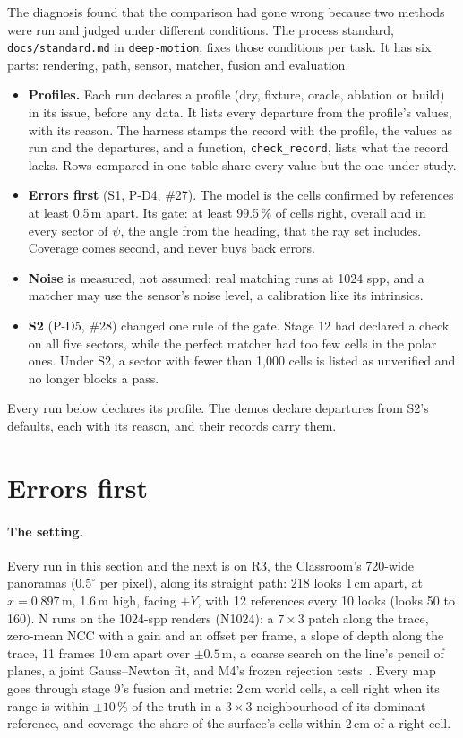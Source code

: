 \documentclass[11pt,a4paper]{article}
\newcommand{\code}[1]{\texttt{\small #1}}
\newcommand{\pth}[1]{{\small\nolinkurl{#1}}}   %
\begin{document}
The diagnosis found that the comparison had gone wrong because two methods were run and judged under different
conditions. The process standard, \pth{docs/standard.md} in \code{deep-motion}, fixes those conditions per task. It
has six parts: rendering, path, sensor, matcher, fusion and evaluation.
\begin{itemize}
\item \textbf{Profiles.} Each run declares a profile (dry, fixture, oracle, ablation or build) in its issue, before
  any data. It lists every departure from the profile's values, with its reason. The harness stamps the record with
  the profile, the values as run and the departures, and a function, \code{check\_record}, lists what the record lacks.
  Rows compared in one table share every value but the one under study.
\item \textbf{Errors first} (S1, P-D4, \#27). The model is the cells confirmed by references at least 0.5\,m apart.
  Its gate: at least 99.5\,\% of cells right, overall and in every sector of $\psi$, the angle from the heading, that
  the ray set includes. Coverage comes second, and never buys back errors.
\item \textbf{Noise} is measured, not assumed: real matching runs at 1024 spp, and a matcher may use the sensor's noise
  level, a calibration like its intrinsics.
\item \textbf{S2} (P-D5, \#28) changed one rule of the gate. Stage 12 had declared a check on all five sectors, while
  the perfect matcher had too few cells in the polar ones. Under S2, a sector with fewer than 1,000 cells is listed as
  unverified and no longer blocks a pass.
\end{itemize}
Every run below declares its profile. The demos declare departures from S2's defaults, each with its reason, and their
records carry them.

\section{Errors first}\label{sec:errors}

\paragraph{The setting.} Every run in this section and the next is on R3, the Classroom's 720-wide panoramas
($0.5^\circ$ per pixel), along its straight path: 218 looks 1\,cm apart, at $x=0.897$\,m, 1.6\,m high, facing $+Y$, with 12 references every 10 looks (looks 50 to 160). N runs on
the 1024-spp renders (N1024): a $7\times3$ patch along the trace, zero-mean NCC with a gain and an offset per frame, a
slope of depth along the trace, 11 frames 10\,cm apart over $\pm0.5$\,m, a coarse search on the line's pencil of planes,
a joint Gauss--Newton fit, and M4's frozen rejection tests~\cite{diag}. Every map goes through stage 9's fusion and
metric: 2\,cm world cells, a cell right when its range is within $\pm10$\,\% of the truth in a $3\times3$ neighbourhood
of its dominant reference, and coverage the share of the surface's cells within 2\,cm of a right cell.
\end{document}
